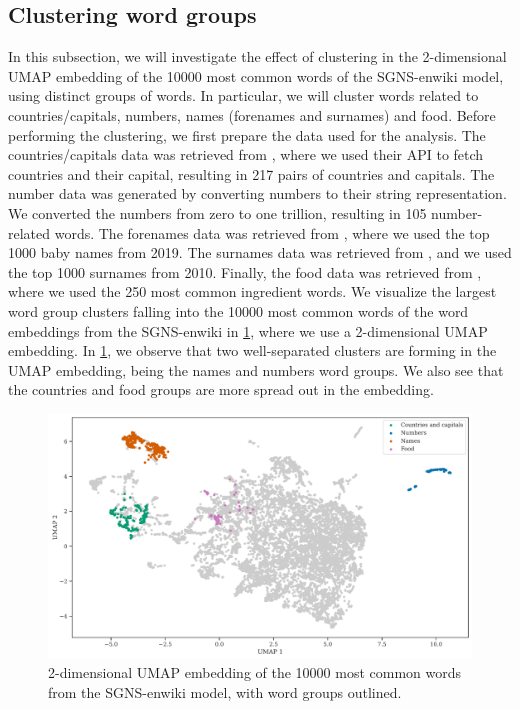 \subsection{Clustering word groups}
\label{sec:clustering-word-groups}
In this subsection, we will investigate the effect of clustering in the 2-dimensional UMAP embedding of the 10000 most common words of the SGNS-enwiki model, using distinct groups of words. In particular, we will cluster words related to countries/capitals, numbers, names (forenames and surnames) and food. Before performing the clustering, we first prepare the data used for the analysis. The countries/capitals data was retrieved from \cite{GeoNames}, where we used their API to fetch countries and their capital, resulting in 217 pairs of countries and capitals. The number data was generated by converting numbers to their string representation. We converted the numbers from zero to one trillion, resulting in 105 number-related words. The forenames data was retrieved from \cite{SSABabyNames}, where we used the top 1000 baby names from 2019. The surnames data was retrieved from \cite{CensusSurnames}, and we used the top 1000 surnames from 2010. Finally, the food data was retrieved from \cite{FoodIngredientList}, where we used the 250 most common ingredient words. We visualize the largest word group clusters falling into the 10000 most common words of the word embeddings from the SGNS-enwiki in \cref{fig:word-cluster-all-groups}, where we use a 2-dimensional UMAP embedding. In \cref{fig:word-cluster-all-groups}, we observe that two well-separated clusters are forming in the UMAP embedding, being the names and numbers word groups. We also see that the countries and food groups are more spread out in the embedding.
\begin{figure}[H]
    \centering
    \includegraphics[width=\textwidth]{thesis/figures/word-cluster-all-groups.pdf}
    \caption{2-dimensional UMAP embedding of the 10000 most common words from the SGNS-enwiki model, with word groups outlined.}
    \label{fig:word-cluster-all-groups}
\end{figure}

